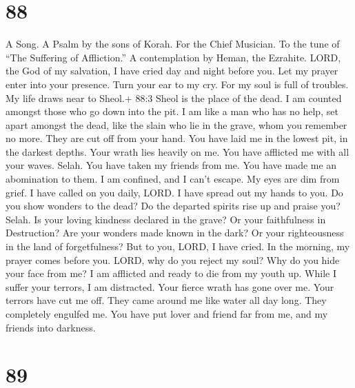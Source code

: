 \hypertarget{section-78}{%
\section{88}\label{section-78}}

A Song. A Psalm by the sons of Korah. For the Chief Musician. To the
tune of ``The Suffering of Affliction.'' A contemplation by Heman, the
Ezrahite.  LORD, the God of my salvation, I have cried day
and night before you.  Let my prayer enter into your
presence. Turn your ear to my cry.  For my soul is full of
troubles. My life draws near to Sheol.+ 88:3 Sheol is the place of the
dead.  I am counted amongst those who go down into the pit.
I am like a man who has no help,  set apart amongst the
dead, like the slain who lie in the grave, whom you remember no more.
They are cut off from your hand.  You have laid me in the
lowest pit, in the darkest depths.  Your wrath lies heavily
on me. You have afflicted me with all your waves. Selah. 
You have taken my friends from me. You have made me an abomination to
them. I am confined, and I can't escape.  My eyes are dim
from grief. I have called on you daily, LORD. I have spread out my hands
to you.  Do you show wonders to the dead? Do the departed
spirits rise up and praise you? Selah.  Is your loving
kindness declared in the grave? Or your faithfulness in Destruction?
 Are your wonders made known in the dark? Or your
righteousness in the land of forgetfulness?  But to you,
LORD, I have cried. In the morning, my prayer comes before you.
 LORD, why do you reject my soul? Why do you hide your face
from me?  I am afflicted and ready to die from my youth up.
While I suffer your terrors, I am distracted.  Your fierce
wrath has gone over me. Your terrors have cut me off.  They
came around me like water all day long. They completely engulfed me.
 You have put lover and friend far from me, and my friends
into darkness.

\hypertarget{section-79}{%
\section{89}\label{section-79}}

